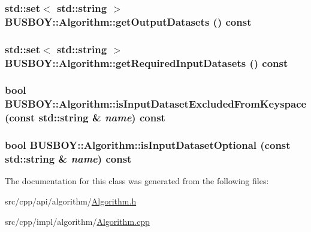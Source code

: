 \label{classBUSBOY_1_1Algorithm_af5d25790065ea0fc6437320ce7f5611a}
\hypertarget{classBUSBOY_1_1Algorithm_ab35abc6b327cdd85e0491fd5dfbd276e}{
\subsubsection[{getOutputDatasets}]{\setlength{\rightskip}{0pt plus 5cm}std::set$<$ std::string $>$ BUSBOY::Algorithm::getOutputDatasets () const}}
\label{classBUSBOY_1_1Algorithm_ab35abc6b327cdd85e0491fd5dfbd276e}
\hypertarget{classBUSBOY_1_1Algorithm_a11ec297205aa9b6a1509d07eff0d5f68}{
\subsubsection[{getRequiredInputDatasets}]{\setlength{\rightskip}{0pt plus 5cm}std::set$<$ std::string $>$ BUSBOY::Algorithm::getRequiredInputDatasets () const}}
\label{classBUSBOY_1_1Algorithm_a11ec297205aa9b6a1509d07eff0d5f68}
\hypertarget{classBUSBOY_1_1Algorithm_a84be1bb5ee7214202a9ca9040c220890}{
\subsubsection[{isInputDatasetExcludedFromKeyspace}]{\setlength{\rightskip}{0pt plus 5cm}bool BUSBOY::Algorithm::isInputDatasetExcludedFromKeyspace (const std::string \& {\em name}) const}}
\label{classBUSBOY_1_1Algorithm_a84be1bb5ee7214202a9ca9040c220890}
\hypertarget{classBUSBOY_1_1Algorithm_ae6f4442c06d26234957c6d70b58376b6}{
\subsubsection[{isInputDatasetOptional}]{\setlength{\rightskip}{0pt plus 5cm}bool BUSBOY::Algorithm::isInputDatasetOptional (const std::string \& {\em name}) const}}
\label{classBUSBOY_1_1Algorithm_ae6f4442c06d26234957c6d70b58376b6}


The documentation for this class was generated from the following files:\begin{DoxyCompactItemize}
\item 
src/cpp/api/algorithm/\hyperlink{Algorithm_8h}{Algorithm.h}\item 
src/cpp/impl/algorithm/\hyperlink{Algorithm_8cpp}{Algorithm.cpp}\end{DoxyCompactItemize}
